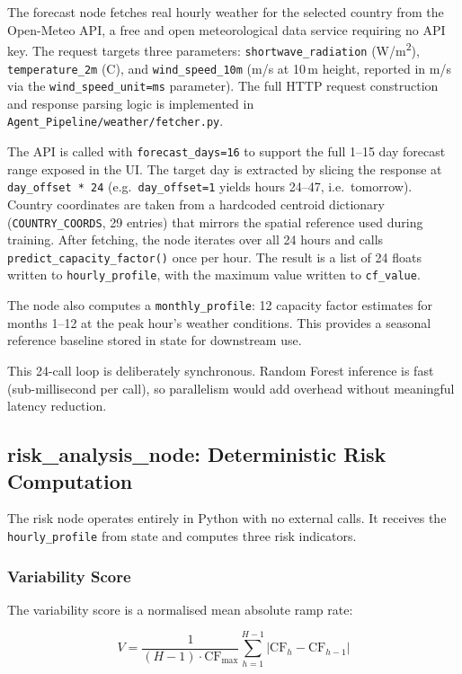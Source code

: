 \documentclass[12pt, a4paper]{article}
\begin{document}
The forecast node fetches real hourly weather for the selected country from the Open-Meteo API, a free and open meteorological data service requiring no API key. The request targets three parameters: \texttt{shortwave\_radiation} (W/m\textsuperscript{2}), \texttt{temperature\_2m} (\textdegree C), and \texttt{wind\_speed\_10m} (m/s at 10\,m height, reported in m/s via the \texttt{wind\_speed\_unit=ms} parameter). The full HTTP request construction and response parsing logic is implemented in \texttt{Agent\_Pipeline/weather/fetcher.py}.

The API is called with \texttt{forecast\_days=16} to support the full 1--15 day forecast range exposed in the UI. The target day is extracted by slicing the response at \texttt{day\_offset * 24} (e.g.\ \texttt{day\_offset=1} yields hours 24--47, i.e.\ tomorrow). Country coordinates are taken from a hardcoded centroid dictionary (\texttt{COUNTRY\_COORDS}, 29 entries) that mirrors the spatial reference used during training. After fetching, the node iterates over all 24 hours and calls \texttt{predict\_capacity\_factor()} once per hour. The result is a list of 24 floats written to \texttt{hourly\_profile}, with the maximum value written to \texttt{cf\_value}.

The node also computes a \texttt{monthly\_profile}: 12 capacity factor estimates for months 1--12 at the peak hour's weather conditions. This provides a seasonal reference baseline stored in state for downstream use.

This 24-call loop is deliberately synchronous. Random Forest inference is fast (sub-millisecond per call), so parallelism would add overhead without meaningful latency reduction.

\subsection{risk\_analysis\_node: Deterministic Risk Computation}

The risk node operates entirely in Python with no external calls. It receives the \texttt{hourly\_profile} from state and computes three risk indicators.

\subsubsection{Variability Score}

The variability score is a normalised mean absolute ramp rate:

\begin{equation}
    V = \frac{1}{(H-1) \cdot \text{CF}_{\max}} \sum_{h=1}^{H-1} \left| \text{CF}_h - \text{CF}_{h-1} \right|
\label{eq:variability}
\end{equation}
\end{document}
